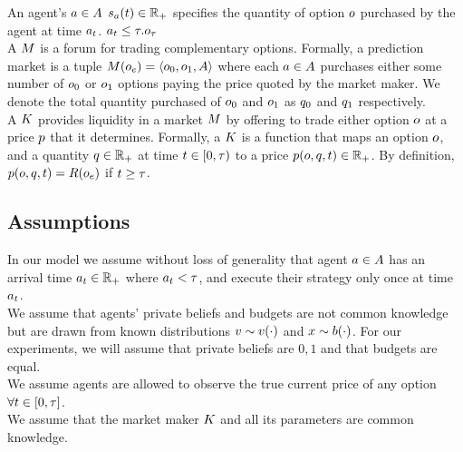 An agent's $a\in A$  
$s_a(t) \in \mathbb{R}_+$ specifies the quantity of option 
$o$ purchased by the agent at time $a_t$. $a_t \leq \tau. o_\tau$\\

A  $M$ is a forum for trading complementary options. 
Formally, a prediction market is a tuple $M(o_e) = 
\left<o_0, o_1, A \right>$ where each  
$a\in A$ purchases 
either some number of $o_0$ or $o_1$ options paying the price quoted by the 
market maker. We denote the total quantity purchased of $o_0$ and $o_1$
as ${q_0}$ and ${q_1}$ respectively. \\

A  $K$ provides liquidity in a market $M$ by
offering to trade either option $o$ at a price $p$ that it determines. 
Formally, a $K$ is a function 
that maps an option $o$, 
and a quantity $q\in\mathbb{R}_+$ at time $t \in [0,\tau)$ 
to a price $p(o,q,t) \in \mathbb{R}_+$. 
By definition, $p(o,q,t) = R(o_e)$ if 
$t \ge \tau$.\\


\subsection{Assumptions}

In our model we assume without loss of generality that agent $a \in A$ has an arrival time 
$a_t \in \mathbb{R}_+$ where $a_t < \tau$, 
and execute their strategy only once at time $a_t$.\\

We assume that agents' private beliefs and budgets are not common knowledge
but are drawn from known distributions $v \sim v(\cdot)$ and
$x \sim b(\cdot)$. For our experiments, we will assume that private beliefs are ${0,1}$ and that budgets are equal.\\

We assume agents are allowed to observe the true current price of any option $\forall t \in \left[0,\tau\right]$.\\

We assume that the market maker $K$ and all its parameters are common knowledge.\\
